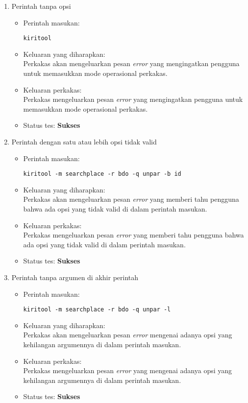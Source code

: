 \begin{enumerate}
	\item Perintah tanpa opsi
	\begin{itemize}
		\item Perintah masukan:
		\begin{verbatim}
kiritool
		\end{verbatim}
		\item Keluaran yang diharapkan: \\
		Perkakas akan mengeluarkan pesan \textit{error} yang mengingatkan pengguna untuk memasukkan mode operasional perkakas.
		\item Keluaran perkakas: \\
		Perkakas mengeluarkan pesan \textit{error} yang mengingatkan pengguna untuk memasukkan mode operasional perkakas.
		\item Status tes: \textbf{Sukses}
	\end{itemize}
	
	\item Perintah dengan satu atau lebih opsi tidak valid
	\begin{itemize}
		\item Perintah masukan:
		\begin{verbatim}
kiritool -m searchplace -r bdo -q unpar -b id
		\end{verbatim}
		\item Keluaran yang diharapkan: \\
		Perkakas akan mengeluarkan pesan \textit{error} yang memberi tahu pengguna bahwa ada opsi yang tidak valid di dalam perintah masukan.
		\item Keluaran perkakas: \\
		Perkakas mengeluarkan pesan \textit{error} yang memberi tahu pengguna bahwa ada opsi yang tidak valid di dalam perintah masukan.
		\item Status tes: \textbf{Sukses}
	\end{itemize}
	
	\item Perintah tanpa argumen di akhir perintah
	\begin{itemize}
		\item Perintah masukan:
		\begin{verbatim}
kiritool -m searchplace -r bdo -q unpar -l
		\end{verbatim}
		\item Keluaran yang diharapkan: \\
		Perkakas akan mengeluarkan pesan \textit{error} mengenai adanya opsi yang kehilangan argumennya di dalam perintah masukan.
		\item Keluaran perkakas: \\
		Perkakas mengeluarkan pesan \textit{error} yang mengenai adanya opsi yang kehilangan argumennya di dalam perintah masukan.
		\item Status tes: \textbf{Sukses}
	\end{itemize}
	

\end{enumerate}
